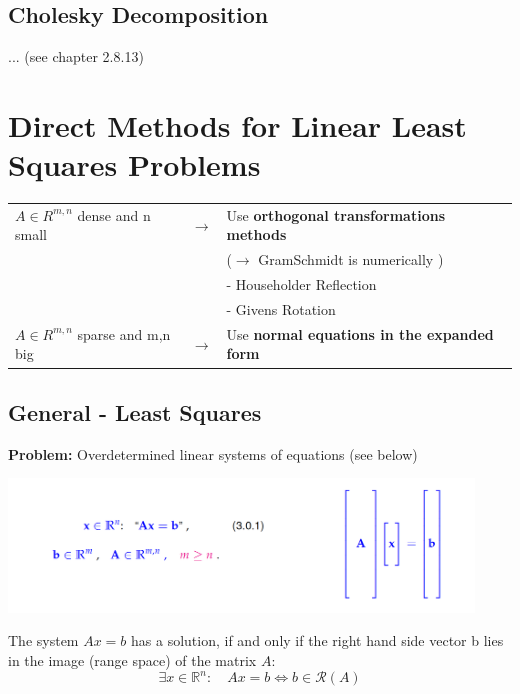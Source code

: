 \documentclass[12pt, a4paper]{article}
\newcommand{\R}{\mathbb{R}}
\begin{document}
\subsection{Cholesky Decomposition}
... (see chapter 2.8.13)

\newpage
\section{Direct Methods for Linear Least Squares Problems}

\begin{tabular}{lll}
$A \in R^{m,n}$ dense and n small		& $\rightarrow$ &   Use \textbf{orthogonal transformations methods}  \\ 
															&  & ($\rightarrow$ GramSchmidt is numerically \color{red}{not stable}\color{black}) \\
															&	& - Householder Reflection \\
															&  & - Givens Rotation \hspace{5mm}\\
$A \in R^{m,n}$ sparse and m,n big 	& $\rightarrow$ &	 Use \textbf{normal equations in the expanded form}   \\ 

\end{tabular}


\subsection{General - Least Squares}

\textbf{Problem:}  \quad Overdetermined linear systems of equations (see below)
\begin{center}
	\includegraphics[width=350pt]{leastsquares_overview.png}
\end{center}


The system $Ax=b$ has a solution, if and only if the right hand side vector b lies in the image (range space) of the matrix $A$:
\[
	\exists x \in \R^{n}: \quad Ax = b \Leftrightarrow b \in \mathcal{R}(A)
\]
\end{document}
